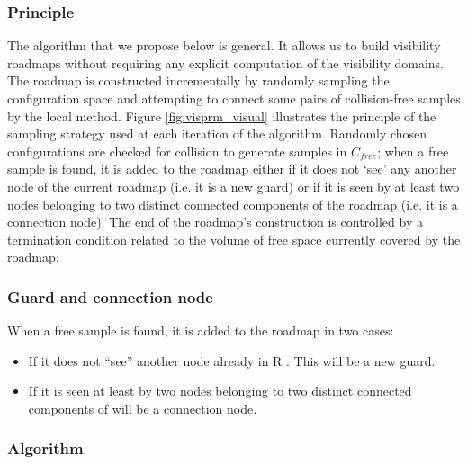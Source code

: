 \documentclass[11pt]{article}
\begin{document}
\subsubsection{Principle}
The algorithm that we propose below is general. It allows us to build visibility
roadmaps without requiring any explicit computation of the visibility domains.
The roadmap is constructed incrementally by randomly sampling the configuration
space and attempting to connect some pairs of collision-free samples by the
local method. Figure \ref{fig:visprm_visual} illustrates the principle of the sampling strategy used at
each iteration of the algorithm. Randomly chosen configurations are checked for
collision to generate samples in $C_{free}$; when a free sample is found, it is added to
the roadmap either if it does not ‘see’ any another node of the current roadmap (i.e.
it is a new guard) or if it is seen by at least two nodes belonging to two distinct
connected components of the roadmap (i.e. it is a connection node). The end of
the roadmap’s construction is controlled by a termination condition related to the
volume of free space currently covered by the roadmap.

\subsubsection{Guard and connection node}
When a free sample is found, it is added to the roadmap in two cases:
\begin{itemize}
\item If it does not “see” another node already in R . This will be a new guard.
\item If it is seen at least by two nodes belonging to two distinct connected components of will be a connection node.
\end{itemize}
\subsubsection{Algorithm}
\end{document}
